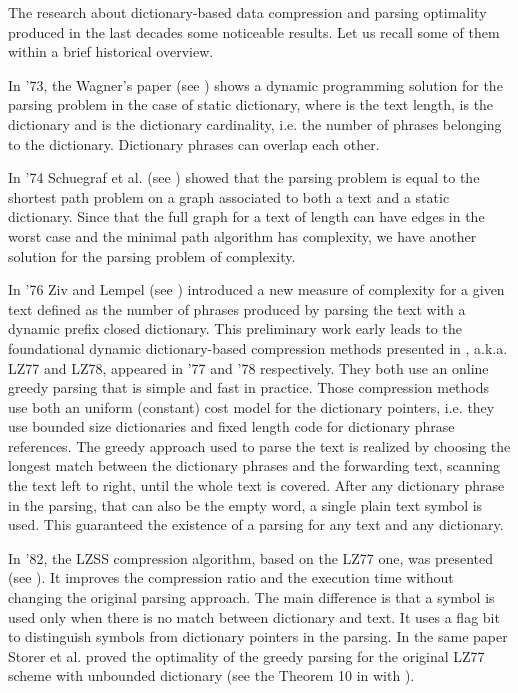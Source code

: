 \documentclass[12pt]{article}
\theoremstyle{plain}
\theoremstyle{definition}
\theoremstyle{remark}
\begin{document}
The research about dictionary-based data compression and parsing optimality produced in the last decades some noticeable results. Let us recall some of them within a brief historical overview.



In '73, the Wagner's paper (see \cite{DBLP:journals/cacm/Wagner73}) shows a  dynamic programming solution for the parsing problem in the case of static dictionary, where 
 is the text length,  is the dictionary and  is the dictionary cardinality, i.e. the number of phrases belonging to the dictionary. Dictionary phrases can overlap each other. 

In '74 Schuegraf et al. (see \cite{Schuegraf}) showed that the parsing problem is equal to the shortest path problem on a graph associated to both a text and a static dictionary.
Since that the full graph for a text of length  can have  edges in the worst case and the minimal path algorithm has  complexity, we have another solution for the parsing problem of   complexity.


In '76 Ziv and Lempel (see \cite{DBLP:journals/tit/LempelZ76}) introduced a new measure of complexity for a given text defined as the number of phrases produced by parsing the text with a dynamic prefix closed dictionary. This preliminary work early leads to the foundational dynamic dictionary-based compression methods presented in \cite{lz77,lz78}, a.k.a. LZ77 and LZ78, appeared in '77 and '78 respectively.
They both use an online greedy parsing that is simple and fast in practice. 
Those compression methods use both an uniform (constant) cost model for the dictionary pointers, i.e. they use bounded size dictionaries and fixed length code for dictionary phrase references. The greedy approach used to parse the text is realized by choosing the longest match between the dictionary phrases and the forwarding text, scanning the text left to right, until the whole text is covered. After any dictionary phrase in the parsing, that can also be the empty word, a single plain text symbol is used. This guaranteed the existence of a parsing for any text and any dictionary.

In '82, the LZSS compression algorithm, based on the LZ77 one, was presented (see \cite{DBLP:journals/jacm/StorerS82}). It improves the compression ratio and the execution time without changing the original parsing approach. The main difference is that a symbol is used only when there is no match between dictionary and text. 
It uses a flag bit to distinguish symbols from dictionary pointers in the parsing. In the same paper Storer et al. proved the optimality of the greedy parsing for the original LZ77 scheme with unbounded dictionary (see the Theorem 10 in \cite{DBLP:journals/jacm/StorerS82} with ).  
\end{document}
